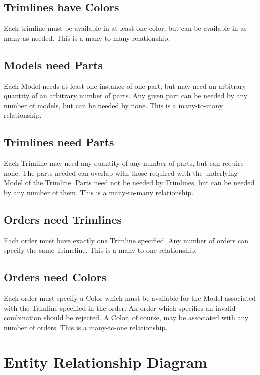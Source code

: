 \documentclass[11pt,letterpaper,oneside]{amsart}
\begin{document}
\subsection*{Trimlines have Colors}

Each trimline must be available in at least one color, but can be available in as many as needed.  This is a many-to-many relationship.

\subsection*{Models need Parts}

Each Model needs at least one instance of one part, but may need an arbitrary quantity of an arbitrary number of parts.  Any given part can be needed by any number of models, but can be needed by none.  This is a many-to-many relationship.

\subsection*{Trimlines need Parts}

Each Trimline may need any quantity of any number of parts, but can require none.  The parts needed can overlap with those required with the underlying Model of the Trimline.  Parts need not be needed by Trimlines, but can be needed by any number of them.  This is a many-to-many relationship. 

\subsection*{Orders need Trimlines}

Each order must have exactly one Trimline specified.  Any number of orders can specify the same Trimeline.  This is a many-to-one relationship.

\subsection*{Orders need Colors}

Each order must specify a Color which must be available for the Model associated with the Trimline specified in the order.  An order which specifies an invalid combination should be rejected.  A Color, of course, may be associated with any number of orders.  This is a many-to-one relationship.

\section*{Entity Relationship Diagram}
\end{document}
